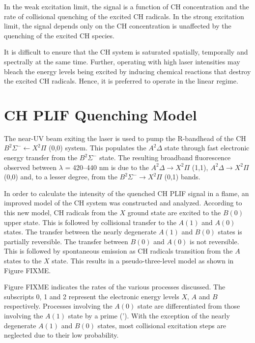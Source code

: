 In the weak excitation limit, the signal is a function of CH concentration and the rate of collisional quenching of the excited CH radicals.
In the strong excitation limit, the signal depends only on the CH concentration is unaffected by the quenching of the excited CH species.

It is difficult to ensure that the CH system is saturated spatially, temporally and spectrally at the same time.
Further, operating with high laser intensities may bleach the energy levels being excited by inducing chemical reactions that destroy the excited CH radicals.
Hence, it is preferred to operate in the linear regime.

\section{CH PLIF Quenching Model}
\label{sec:quenchingmodel}

The near-UV beam exiting the laser is used to pump the R-bandhead of the CH \(B^2\Sigma^- \leftarrow X^2\Pi\) (0,0) system.
This populates the \(A^2\Delta\) state through fast electronic energy transfer from the \(B^2\Sigma^-\) state.
The resulting broadband fluorescence observed between \(\lambda\) = 420--440 nm is due to the \(A^2\Delta \rightarrow X^2\Pi\) (1,1), \(A^2\Delta \rightarrow X^2\Pi\) (0,0) and, to a lesser degree, from the \(B^2\Sigma^- \rightarrow X^2\Pi\) (0,1) bands.


In order to calculate the intensity of the quenched CH PLIF signal in a flame, an improved model of the CH system was constructed and analyzed.
According to this new model, CH radicals from the \(X\) ground state are excited to the \(B(0)\) upper state.
This is followed by collisional transfer to the \(A(1)\) and \(A(0)\) states.
The transfer between the nearly degenerate \(A(1)\) and \(B(0)\) states is partially reversible.
The transfer between \(B(0)\) and \(A(0)\) is not reversible.
This is followed by spontaneous emission as CH radicals transition from the \(A\) states to the \(X\) state.
This results in a pseudo-three-level model as shown in Figure FIXME.

Figure FIXME indicates the rates of the various processes discussed.
The subscripts 0, 1 and 2 represent the electronic energy levels \(X\), \(A\) and \(B\) respectively.
Processes involving the \(A(0)\) state are differentiated from those involving the \(A(1)\) state by a prime (').
With the exception of the nearly degenerate \(A(1)\) and \(B(0)\) states, most collisional excitation steps are neglected due to their low probability.

